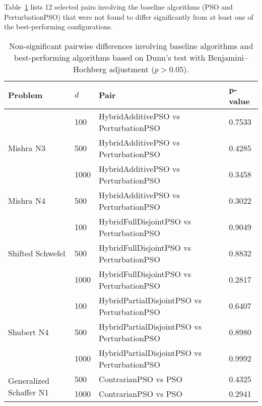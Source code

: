 {Table~\ref{tab:dunnfail} lists 12 selected pairs involving the baseline algorithms (PSO and PerturbationPSO) that were not found to differ significantly from at least one of the best-performing configurations.


\begin{longtable}{llp{}l}
\caption[Non-significant pairwise differences from Dunn's test]{Non-significant pairwise differences involving baseline algorithms and best-performing algorithms based on Dunn’s test with Benjamini–Hochberg adjustment ($p > 0.05$).}
\label{tab:dunnfail}
\\
\toprule
\textbf{Problem} & \textbf{$d$} & \textbf{Pair} & \textbf{p-value} \\
\midrule
\multirow{3}{*}{Mishra N3}
    & 100  & HybridAdditivePSO vs PerturbationPSO        & 0.7533 \\
    & 500  & HybridAdditivePSO vs PerturbationPSO        & 0.4285 \\
    & 1000 & HybridAdditivePSO vs PerturbationPSO        & 0.3458 \\
\midrule
\multirow{1}{*}{Mishra N4}
    & 500  & HybridAdditivePSO vs PerturbationPSO        & 0.3022 \\
\midrule
\multirow{3}{*}{Shifted Schwefel}
    & 100  & HybridFullDisjointPSO vs PerturbationPSO    & 0.9049 \\
    & 500  & HybridFullDisjointPSO vs PerturbationPSO    & 0.8832 \\
    & 1000 & HybridFullDisjointPSO vs PerturbationPSO    & 0.2817 \\
\midrule
\multirow{3}{*}{Shubert N4}
    & 100  & HybridPartialDisjointPSO vs PerturbationPSO & 0.6407 \\
    & 500  & HybridPartialDisjointPSO vs PerturbationPSO & 0.8980 \\
    & 1000 & HybridPartialDisjointPSO vs PerturbationPSO & 0.9992 \\
\midrule
\multirow{2}{*}{Generalized Schaffer N1}
    & 500  & ContrarianPSO vs PSO                        & 0.4325 \\
    & 1000 & ContrarianPSO vs PSO                        & 0.2941 \\
\bottomrule
\end{longtable}


}
